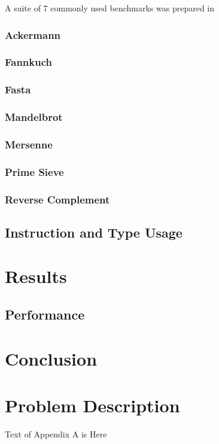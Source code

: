 \documentclass[english,a4paper]{report}
\begin{document}
A suite of 7 commonly used benchmarks was prepared in 

\subsection{Ackermann}
\subsection{Fannkuch}
\subsection{Fasta}
\subsection{Mandelbrot}
\subsection{Mersenne}
\subsection{Prime Sieve}
\subsection{Reverse Complement}

\section{Instruction and Type Usage}


\chapter{Results}

\section{Performance}

\chapter{Conclusion}

\newpage{}
\appendix
\chapter{Problem Description} 

Text of Appendix A is Here
\end{document}
